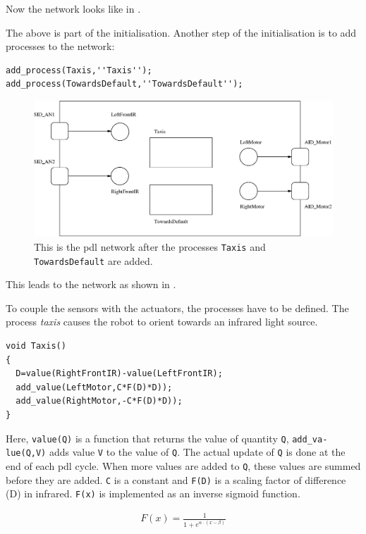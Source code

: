 Now the network looks like in .

The above is part of the initialisation. Another step of the initialisation is to add processes to the network:


{\footnotesize\begin{verbatim}
add_process(Taxis,''Taxis'');
add_process(TowardsDefault,''TowardsDefault'');
\end{verbatim}}

\begin{figure}
\centerline{\includegraphics[width=12cm]{robots//pdl_networkc.eps}}
\caption{This is the {\sc pdl} network after the processes \texttt{Taxis} and \texttt{TowardsDefault} are added.}
\label{f:robots:pdl_networkc}
\end{figure}


This leads to the network as shown in . 

To couple the sensors with the actuators, the processes have to be defined. The process {\em taxis} causes the robot to orient towards an infrared light source.


{\footnotesize\begin{verbatim}
void Taxis()
{
  D=value(RightFrontIR)-value(LeftFrontIR);
  add_value(LeftMotor,C*F(D)*D));
  add_value(RightMotor,-C*F(D)*D));
}
\end{verbatim}}


Here, \texttt{value(Q)} is a function that returns the value of quantity \texttt{Q}, {\tt add\_va-lue(Q,V)} adds value \texttt{V} to the value of \texttt{Q}. The actual update of \texttt{Q} is done at the end of each {\sc pdl} cycle. When more values are added to \texttt{Q}, these values are summed before they are added. \texttt{C} is a constant and \texttt{F(D)} is a scaling factor of difference (D) in infrared. \texttt{F(x)} is implemented as an inverse sigmoid function.

\begin{eqnarray*}
F(x)=\frac{1}{1+e^{\alpha \cdot (x - \beta)}}
\end{eqnarray*}

